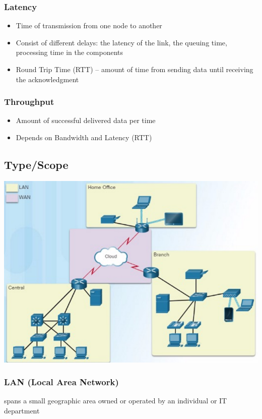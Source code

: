 \documentclass[11pt]{article}
\begin{document}
\subsubsection{Latency}
    \begin{itemize}
        \item Time of transmission from one node to another
        \item Consist of different delays: the latency of the link, the queuing time, processing time in the components
        \item Round Trip Time (RTT) – amount of time from sending data until receiving the acknowledgment
    \end{itemize}
\subsubsection{Throughput}
    \begin{itemize}
        \item Amount of successful delivered data per time
        \item Depends on Bandwidth and Latency (RTT)
    \end{itemize}
\subsection{Type/Scope}
    \includegraphics[width=\textwidth]{type-scope}
    \subsubsection{LAN (Local Area Network)}
    spans a small geographic area owned or operated by an individual or IT department
\end{document}

